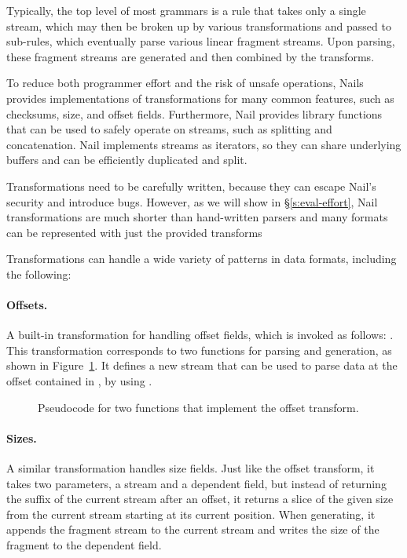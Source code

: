 Typically, the top level of most grammars is a rule that takes only a single stream, which may then
be broken up by various transformations and passed to sub-rules, which eventually parse various linear
fragment streams. Upon parsing, these fragment streams are generated and then combined by the
transforms.

 To reduce both programmer effort and the risk of unsafe operations, Nails provides implementations of
transformations for many common features, such as checksums, size, and offset fields. Furthermore,
Nail provides library functions that can be used to safely operate on streams, such as splitting and
concatenation. Nail implements streams as iterators, so they can share underlying buffers and can be
efficiently duplicated and split.

Transformations need to be carefully written, because they can escape Nail's security and introduce
bugs. However, as we will show in \S\ref{s:eval-effort}, Nail transformations are much shorter than
hand-written parsers and many formats can be represented with just the provided transforms

Transformations can handle a wide variety of patterns in data formats, including the following: 
\paragraph{Offsets.}
A built-in transformation for handling offset fields, which is invoked as follows:
. 
This transformation corresponds to two functions for parsing and
generation, as shown in Figure~\ref{fig:xform-sig}. It defines a new stream  that can
be used to parse data at the offset contained in , by
using .

\begin{figure}[h]
\smaller[0.5]

\caption{Pseudocode for two functions that implement the offset transform.}
\label{fig:xform-sig}
\end{figure}


\paragraph{Sizes.}
A similar transformation handles size fields. Just like the offset transform, it takes two parameters, a
stream and a dependent field, but instead of returning the suffix of the current stream after an
offset, it returns a slice of the given size from the current stream starting at its current
position. When generating, it appends the fragment stream to the current stream and writes the size
of the fragment to the dependent field.

